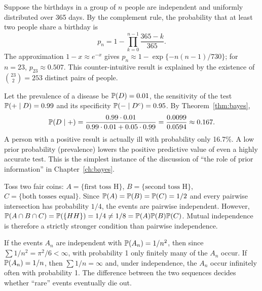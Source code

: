 \documentclass[main.tex]{subfiles}
\begin{document}
\begin{example}\label{ex:dogum-gunu}
Suppose the birthdays in a group of $n$ people are independent and uniformly distributed over 365 days. By the complement rule, the probability that at least two people share a birthday is
\[
p_n = 1-\prod_{k=0}^{n-1}\frac{365-k}{365} .
\]
The approximation $1-x\approx e^{-x}$ gives $p_n\approx 1-\exp\{-n(n-1)/730\}$; for $n=23$, $p_{23}\approx 0.507$. This counter-intuitive result is explained by the existence of $\binom{23}{2}=253$ distinct pairs of people.
\end{example}

\begin{example}\label{ex:tani}
Let the prevalence of a disease be $\P(D)=0.01$, the sensitivity of the test $\P(+\mid D)=0.99$ and its specificity $\P(-\mid D^c)=0.95$. By Theorem~\ref{thm:bayes},
\[
\P(D\mid +)=\frac{0.99\cdot 0.01}{0.99\cdot0.01+0.05\cdot0.99}=\frac{0.0099}{0.0594}\approx 0.167 .
\]
A person with a positive result is actually ill with probability only 16.7\%. A low prior probability (prevalence) lowers the positive predictive value of even a highly accurate test. This is the simplest instance of the discussion of ``the role of prior information'' in Chapter~\ref{ch:bayes}.
\end{example}

\begin{example}
Toss two fair coins: $A=\{\text{first toss H}\}$, $B=\{\text{second toss H}\}$, $C=\{\text{both tosses equal}\}$. Since $\P(A)=\P(B)=\P(C)=1/2$ and every pairwise intersection has probability $1/4$, the events are pairwise independent. However, $\P(A\cap B\cap C)=\P(\{HH\})=1/4\neq 1/8=\P(A)\P(B)\P(C)$. Mutual independence is therefore a strictly stronger condition than pairwise independence.
\end{example}

\begin{example}
If the events $A_n$ are independent with $\P(A_n)=1/n^2$, then since $\sum 1/n^2=\pi^2/6<\infty$, with probability 1 only finitely many of the $A_n$ occur. If $\P(A_n)=1/n$, then $\sum 1/n=\infty$ and, under independence, the $A_n$ occur infinitely often with probability 1. The difference between the two sequences decides whether ``rare'' events eventually die out.
\end{example}
\end{document}
